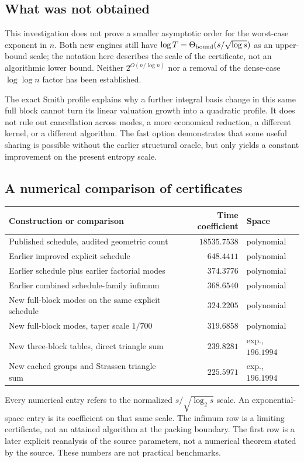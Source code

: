 \documentclass[11pt,letterpaper]{article}
\theoremstyle{definition}\newtheorem{definition}[theorem]{Definition}
\theoremstyle{remark}\newtheorem{remark}[theorem]{Remark}
\begin{document}
\subsection{What was not obtained}

This investigation does not prove a smaller asymptotic order for the
worst-case exponent in $n$. Both new engines still have
$\log T=\Theta_{\rm bound}(s/\sqrt{\log s})$ as an upper-bound scale;
the notation here describes the scale of the certificate, not an algorithmic
lower bound. Neither $2^{O(n/\log n)}$ nor a removal of the dense-case
$\log\log n$ factor has been established.

The exact Smith profile explains why a further integral basis change in
this same full block cannot turn its linear valuation growth into a
quadratic profile. It does not rule out cancellation across modes, a more
economical reduction, a different kernel, or a different algorithm.
The fast option demonstrates that some useful sharing is possible without
the earlier structural oracle, but only yields a constant improvement on
the present entropy scale.

\subsection{A numerical comparison of certificates}

\begin{center}\small
\begin{tabular}{@{}p{}r l@{}}
\toprule
Construction or comparison & Time coefficient & Space\\
\midrule
Published schedule, audited geometric count & $18535.7538$ & polynomial\\
Earlier improved explicit schedule & $648.4411$ & polynomial\\
Earlier schedule plus earlier factorial modes & $374.3776$ & polynomial\\
Earlier combined schedule-family infimum & $368.6540$ & polynomial\\
New full-block modes on the same explicit schedule & $324.2205$ & polynomial\\
New full-block modes, taper scale $1/700$ & $319.6858$ & polynomial\\
New three-block tables, direct triangle sum & $239.8281$ & exp., $196.1994$\\
New cached groups and Strassen triangle sum & $225.5971$ & exp., $196.1994$\\
\bottomrule
\end{tabular}
\end{center}
Every numerical entry refers to the normalized $s/\sqrt{\log_2s}$ scale.
An exponential-space entry is its coefficient on that same scale.
The infimum row is a limiting certificate, not an attained algorithm at the
packing boundary. The first row is a later explicit reanalysis of the source
parameters, not a numerical theorem stated by the source. These numbers are
not practical benchmarks.
\end{document}
